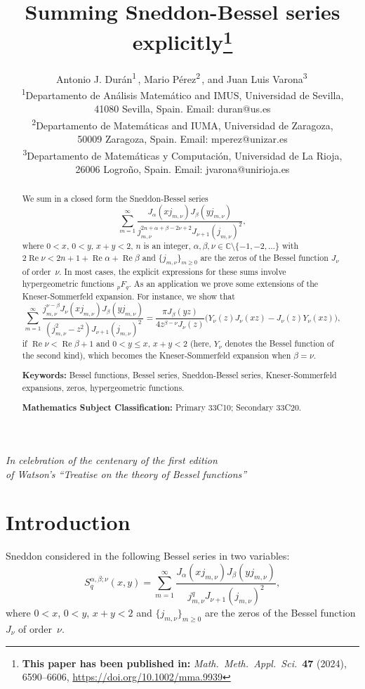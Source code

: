 \documentclass[10pt,leqno,a4paper]{article}
\title{Summing Sneddon-Bessel series explicitly\thanks{\textbf{This paper has been published in:} \textit{Math.\ Meth.\ Appl.\ Sci.}\ \textbf{47} (2024), 6590--6606, 
\url{https://doi.org/10.1002/mma.9939}}}
\author{Antonio J. Dur\'an\textsuperscript{1}\,\orcidlink{0000-0002-8351-7392}, 
Mario P\'erez\textsuperscript{2}\,\orcidlink{0000-0002-3050-3712},
and Juan Luis Varona\textsuperscript{3}\,\orcidlink{0000-0002-2023-9946}
\\[6pt]
\small\textsuperscript{1}Departamento de An\'alisis Matem\'atico and IMUS,
Universidad de Sevilla,\\[-2pt]
\small 41080 Sevilla, Spain. Email: {duran@us.es}\\[6pt]
\small\textsuperscript{2}Departamento de Matem\'aticas and IUMA,
Universidad de Zaragoza,\\[-2pt]
\small 50009 Zaragoza, Spain. Email: {mperez@unizar.es}\\[6pt]
\small\textsuperscript{3}Departamento de Matem\'aticas y Computaci\'on,
Universidad de La Rioja,\\[-2pt]
\small 26006 Logro\~no, Spain. Email: {jvarona@unirioja.es}}
\date{}
\theoremstyle{plain}
\newcommand{\CC}{\mathbb{C}}
\renewcommand{\Re}{\operatorname{Re}}
\numberwithin{equation}{section}
\begin{document}

\maketitle

\begin{center}\itshape\small
In celebration of the centenary of the first edition\\
of Watson's ``Treatise on the theory of Bessel functions''
\bigskip
\end{center}

\begin{abstract}
We sum in a closed form the Sneddon-Bessel series
\[
   \sum_{m=1}^\infty
   \frac{J_\alpha(x j_{m,\nu})J_\beta(y j_{m,\nu})}
   {j_{m,\nu}^{2n+\alpha+\beta-2\nu+2} J_{\nu+1}(j_{m,\nu})^2},
\]
where $0<x$, $0<y$, $x+y<2$, $n$ is an integer, $\alpha,\beta,\nu\in \CC\setminus \{-1,-2,\dots \}$ with $2\Re \nu<2n+1+\Re \alpha+\Re \beta$ and $\{j_{m,\nu}\}_{m\geq 0}$ are the zeros of the Bessel function $J_\nu$ of order~$\nu$. In most cases, the explicit expressions for these sums involve hypergeometric functions ${}_pF_q$.
As an application we prove some extensions of the Kneser-Sommerfeld expansion. For instance, we show that
\[
   \sum_{m=1}^\infty
   \frac{j_{m,\nu}^{\nu-\beta}J_\nu(x j_{m,\nu})J_\beta(y j_{m,\nu})}
   {(j_{m,\nu}^{2}-z^2) J_{\nu+1}(j_{m,\nu})^2}
   = \frac{\pi J_\beta(yz)}{4 z^{\beta-\nu}J_\nu(z)}
   \big(Y_\nu(z)J_\nu(xz)-J_\nu(z)Y_\nu(xz)\big),
\]
if $\Re\nu < \Re\beta + 1$ and $0 < y \leq x$, $x+y<2$ (here, $Y_\nu$ denotes the Bessel function of the second kind), which becomes the Kneser-Sommerfeld expansion when $\beta=\nu$.

\medskip

\noindent
\textbf{Keywords:}
Bessel functions, Bessel series, Sneddon-Bessel series, Kneser-Sommerfeld expansions,
zeros, hypergeometric functions.

\medskip

\noindent
\textbf{Mathematics Subject Classification:} Primary 33C10; Secondary 33C20.
\end{abstract}

\section{Introduction}

Sneddon considered in \cite[\S\,2.2]{Sne} the following Bessel series in two variables:
\begin{equation}
\label{lap}
   S_q^{\alpha,\beta;\nu}(x,y)
   = \sum_{m=1}^\infty
   \frac{J_\alpha(x j_{m,\nu})J_\beta(y j_{m,\nu})}{j_{m,\nu}^{q} J_{\nu+1}(j_{m,\nu})^2},
\end{equation}
where $0<x$, $0<y$, $x+y<2$ and $\{j_{m,\nu}\}_{m\geq 0}$ are the zeros of the Bessel function $J_\nu$ of order~$\nu$.
\end{document}
